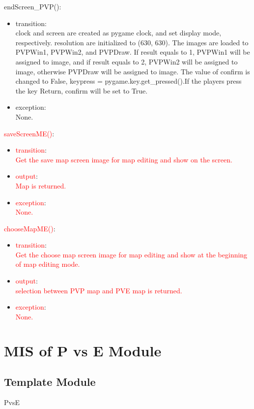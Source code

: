 \documentclass[12pt, titlepage]{article}
\begin{document}
		endScreen\_PVP():
		\begin{itemize}
		\item transition:\\clock and screen are created as pygame clock, and set display mode, respectively. resolution are initialized to (630, 630). The images are loaded to PVPWin1, PVPWin2, and PVPDraw. If result equals to 1, PVPWin1 will be assigned to image, and if result equals to 2, PVPWin2 will be assigned to image, otherwise PVPDraw will be assigned to image. The value of confirm is changed to False, keypress = pygame.key.get\_pressed().If the players press the key Return, confirm will be set to True.
		\item exception:\\ None.
		\end{itemize}
		
		\textcolor{red}{saveScreenME()}:
		\begin{itemize}
		\item \textcolor{red}{transition}:\\ \textcolor{red}{Get the save map screen image for map editing and show on the screen.}
		\item \textcolor{red}{output}:\\\textcolor{red}{Map is returned.}
		\item \textcolor{red}{exception}:\\\textcolor{red}{None.}
		\end{itemize}
        
        \textcolor{red}{chooseMapME()}:
		\begin{itemize}
		\item \textcolor{red}{transition}:\\ \textcolor{red}{Get the choose map screen image for map editing and show at the beginning of map editing mode.}
		\item \textcolor{red}{output}:\\\textcolor{red}{selection between PVP map and PVE map is returned.}
		\item \textcolor{red}{exception}:\\\textcolor{red}{None.}
		\end{itemize}
        
\section{MIS of P vs E Module}
        \subsection{Template Module}
        PvsE
\end{document}
